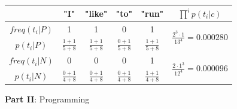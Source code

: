 \documentclass{article}
\begin{document}
\begin{enumerate}[leftmargin=\labelsep]
\begin{table}[H]
  \centering
  \begin{tabular}{ccccc|c}
     & "I" & "like" & "to" & "run" & $\prod^ip(t_i|c)$ \\ \toprule
    $freq(t_i | P)$ & 1 & 1 & 0 & 1 & \multirow{2}{*}{$\frac{2^3\cdot 1}{13^4}=0.000280$} \\
    $p(t_i|P)$      & $\frac{1+1}{5+8}$ & $\frac{1+1}{5+8}$ & $\frac{0+1}{5+8}$ & $\frac{1+1}{5+8}$ \\ \midrule
    $freq(t_i | N)$ & 0 & 0 & 0 & 1 & \multirow{2}{*}{$\frac{2\cdot 1^3}{12^4}=0.000096$} \\
    $p(t_i|N)$      & $\frac{0+1}{4+8}$ & $\frac{0+1}{4+8}$ & $\frac{0+1}{4+8}$ & $\frac{1+1}{4+8}$ \\
  \end{tabular}
\end{table}

\centering
{}
\end{enumerate}
\newpage
\large{\textbf{Part II}: Programming}\normalsize
\end{document}
